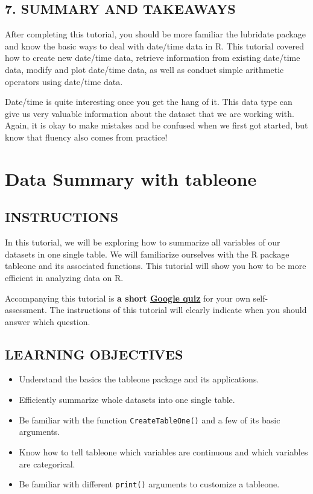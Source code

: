 \documentclass[
]{book}
\providecommand{\tightlist}{%
  \setlength{\itemsep}{0pt}\setlength{\parskip}{0pt}}
\begin{document}
\hypertarget{summary-and-takeaways-1}{%
\section{7. SUMMARY AND TAKEAWAYS}\label{summary-and-takeaways-1}}

After completing this tutorial, you should be more familiar the lubridate package and know the basic ways to deal with date/time data in R. This tutorial covered how to create new date/time data, retrieve information from existing date/time data, modify and plot date/time data, as well as conduct simple arithmetic operators using date/time data.

Date/time is quite interesting once you get the hang of it. This data type can give us very valuable information about the dataset that we are working with. Again, it is okay to make mistakes and be confused when we first got started, but know that fluency also comes from practice!

\hypertarget{data-summary-with-tableone}{%
\chapter{Data Summary with tableone}\label{data-summary-with-tableone}}

\hypertarget{instructions-7}{%
\section{INSTRUCTIONS}\label{instructions-7}}

In this tutorial, we will be exploring how to summarize all variables of our datasets in one single table. We will familiarize ourselves with the R package tableone and its associated functions. This tutorial will show you how to be more efficient in analyzing data on R.

Accompanying this tutorial is \textbf{a short \href{https://forms.gle/vDvUJhHDAuKHVNt98}{Google quiz}} for your own self-assessment. The instructions of this tutorial will clearly indicate when you should answer which question.

\hypertarget{learning-objectives-7}{%
\section{LEARNING OBJECTIVES}\label{learning-objectives-7}}

\begin{itemize}
\tightlist
\item
  Understand the basics the tableone package and its applications.
\item
  Efficiently summarize whole datasets into one single table.
\item
  Be familiar with the function \texttt{CreateTableOne()} and a few of its basic arguments.
\item
  Know how to tell tableone which variables are continuous and which variables are categorical.
\item
  Be familiar with different \texttt{print()} arguments to customize a tableone.
\end{itemize}
\end{document}
